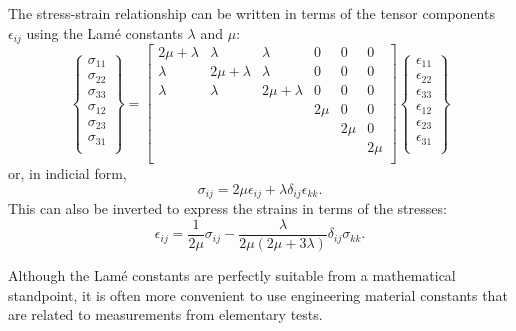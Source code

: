 The stress-strain relationship can be written in terms of the tensor components $\epsilon_{ij}$ using the Lamé constants $\lambda$ and $\mu$:
\begin{equation*}
  \left\{ \begin{array}{cccccc}
    \sigma_{11}\\
  \sigma_{22}\\
  \sigma_{33}\\
  \sigma_{12}\\
  \sigma_{23}\\
  \sigma_{31}\\
  \end{array} \right\} = \begin{bmatrix}
    2\mu + \lambda & \lambda & \lambda & 0 & 0 & 0\\
  \lambda  & 2 \mu + \lambda & \lambda & 0 & 0 & 0\\
  \lambda & \lambda & 2 \mu + \lambda & 0 & 0 & 0\\
   &  &  & 2\mu & 0 & 0\\
   &  &  &  & 2\mu & 0\\
   &  &  &  &  &2\mu \\
  \end{bmatrix} \left\{ \begin{array}{cccccc}
    \epsilon_{11}\\
  \epsilon_{22}\\
  \epsilon_{33}\\
  \epsilon_{12}\\
  \epsilon_{23}\\
  \epsilon_{31}\\
  \end{array} \right\}
\end{equation*}
or, in indicial form,
\begin{equation*}
  \sigma_{ij} = 2\mu \epsilon_{ij} + \lambda \delta_{ij} \epsilon_{kk}
.\end{equation*}
This can also be inverted to express the strains in terms of the stresses:
\begin{equation*}
  \epsilon_{ij} = \frac{1}{2\mu}\sigma_{ij} - \frac{\lambda}{2\mu \left( 2 \mu + 3\lambda \right)} \delta_{ij} \sigma_{kk}
.\end{equation*}

Although the Lamé constants are perfectly suitable from a mathematical standpoint, it is often more convenient to use engineering material constants that are related to measurements from elementary tests.

